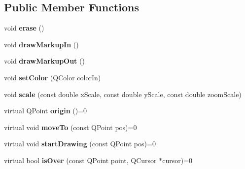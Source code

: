 \subsection*{Public Member Functions}
\begin{DoxyCompactItemize}
\item 
\hypertarget{classmarkupItem_a0960bc952de9878a50428d0533e4f457}{
void {\bfseries erase} ()}
\label{classmarkupItem_a0960bc952de9878a50428d0533e4f457}

\item 
\hypertarget{classmarkupItem_a11e173b096f676a87aba4de85853d941}{
void {\bfseries drawMarkupIn} ()}
\label{classmarkupItem_a11e173b096f676a87aba4de85853d941}

\item 
\hypertarget{classmarkupItem_a11adfa5a6c13f2186896c73be533a00c}{
void {\bfseries drawMarkupOut} ()}
\label{classmarkupItem_a11adfa5a6c13f2186896c73be533a00c}

\item 
\hypertarget{classmarkupItem_a1fc353c63476eb484b58188f9f680ae8}{
void {\bfseries setColor} (QColor colorIn)}
\label{classmarkupItem_a1fc353c63476eb484b58188f9f680ae8}

\item 
\hypertarget{classmarkupItem_a02a5561949003f6893cc10f2a6bcb446}{
void {\bfseries scale} (const double xScale, const double yScale, const double zoomScale)}
\label{classmarkupItem_a02a5561949003f6893cc10f2a6bcb446}

\item 
\hypertarget{classmarkupItem_a5bdb8872afad86a0a41b0095765a0767}{
virtual QPoint {\bfseries origin} ()=0}
\label{classmarkupItem_a5bdb8872afad86a0a41b0095765a0767}

\item 
\hypertarget{classmarkupItem_a275f48d7efe53a49be4eb9975596a318}{
virtual void {\bfseries moveTo} (const QPoint pos)=0}
\label{classmarkupItem_a275f48d7efe53a49be4eb9975596a318}

\item 
\hypertarget{classmarkupItem_a94aa96638199a9c663832e259b7c0212}{
virtual void {\bfseries startDrawing} (const QPoint pos)=0}
\label{classmarkupItem_a94aa96638199a9c663832e259b7c0212}

\item 
\hypertarget{classmarkupItem_ac6971d75b1ac89975a38d24157c4830a}{
virtual bool {\bfseries isOver} (const QPoint point, QCursor $\ast$cursor)=0}
\label{classmarkupItem_ac6971d75b1ac89975a38d24157c4830a}


\end{DoxyCompactItemize}

